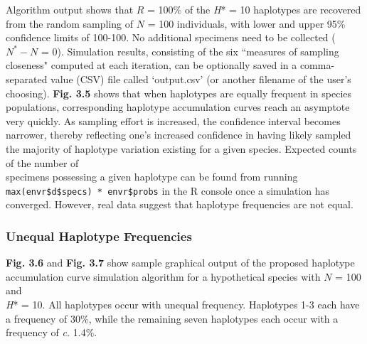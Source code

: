 Algorithm output shows that $R$ = 100\% of the \textit{H}* = 10 haplotypes are recovered from the random sampling of $N$ = 100 individuals, with lower and upper 95\% confidence limits of 100-100. No additional specimens need to be collected ($N^*-N$ = 0). Simulation results, consisting of the six ``measures of sampling closeness" computed at each iteration, can be optionally saved in a comma-separated value (CSV) file called `output.csv' (or another filename of the user's choosing). \textbf{Fig. 3.5} shows that when haplotypes are equally frequent in species populations, corresponding haplotype accumulation curves reach an asymptote very quickly. As sampling effort is increased, the confidence interval becomes narrower, thereby reflecting one's increased confidence in having likely sampled the majority of haplotype variation existing for a given species. Expected counts of the number of \\ specimens possessing a given haplotype can be found from running \\ {\tt max(envr\$d\$specs) * envr\$probs} in the R console once a simulation has \\ converged. However, real data suggest that haplotype frequencies are not equal.

\subsubsection{Unequal Haplotype Frequencies}

\textbf{Fig. 3.6} and \textbf{Fig. 3.7} show sample graphical output of the proposed haplotype \\ accumulation curve simulation algorithm for a hypothetical species with $N$ = 100 and \\ \textit{H}* = 10. All haplotypes occur with unequal frequency. Haplotypes 1-3 each have a frequency of 30\%, while the remaining seven haplotypes each occur with a frequency of \textit{c.} 1.4\%. 

\vspace{3mm}

